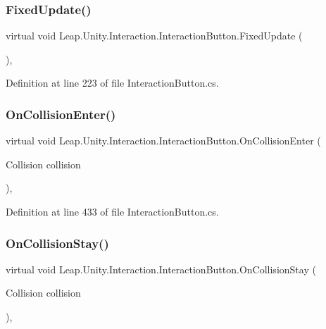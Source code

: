 \subsubsection{\texorpdfstring{FixedUpdate()}{FixedUpdate()}}
{\footnotesize\ttfamily virtual void Leap.\+Unity.\+Interaction.\+Interaction\+Button.\+Fixed\+Update (\begin{DoxyParamCaption}{ }\end{DoxyParamCaption})\hspace{0.3cm}{\ttfamily [protected]}, {\ttfamily [virtual]}}



Definition at line 223 of file Interaction\+Button.\+cs.

\mbox{\label{class_leap_1_1_unity_1_1_interaction_1_1_interaction_button_ab6a9d171b2ed581ae70aa9844f52fa68}} 
\subsubsection{\texorpdfstring{OnCollisionEnter()}{OnCollisionEnter()}}
{\footnotesize\ttfamily virtual void Leap.\+Unity.\+Interaction.\+Interaction\+Button.\+On\+Collision\+Enter (\begin{DoxyParamCaption}\item[{Collision}]{collision }\end{DoxyParamCaption})\hspace{0.3cm}{\ttfamily [protected]}, {\ttfamily [virtual]}}



Definition at line 433 of file Interaction\+Button.\+cs.

\mbox{\label{class_leap_1_1_unity_1_1_interaction_1_1_interaction_button_ad24ae3e0c1a3a9feb60ea3046d6a01b6}} 
\subsubsection{\texorpdfstring{OnCollisionStay()}{OnCollisionStay()}}
{\footnotesize\ttfamily virtual void Leap.\+Unity.\+Interaction.\+Interaction\+Button.\+On\+Collision\+Stay (\begin{DoxyParamCaption}\item[{Collision}]{collision }\end{DoxyParamCaption})\hspace{0.3cm}{\ttfamily [protected]}, {\ttfamily [virtual]}}



